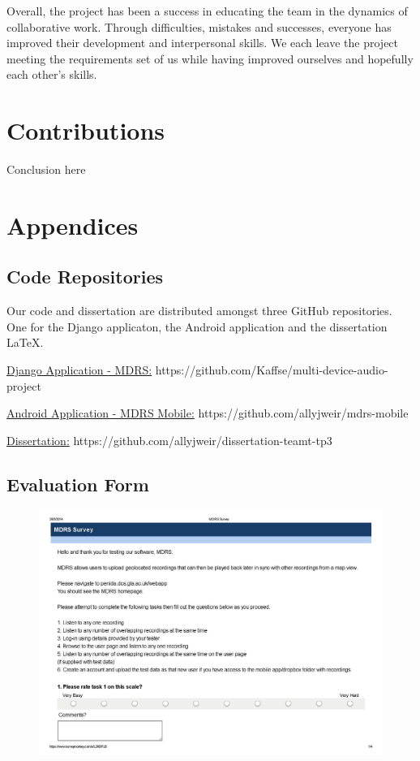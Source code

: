 \documentclass{l3proj}
\begin{document}
Overall, the project has been a success in educating the team in the dynamics of collaborative work. Through difficulties, mistakes and successes, everyone has improved their development and interpersonal skills. We each leave the project meeting the requirements set of us while having improved ourselves and hopefully each other's skills.

\section{Contributions}

Conclusion here

\section{Appendices}
\subsection{Code Repositories}
Our code and dissertation are distributed amongst three GitHub repositories. One for the Django applicaton, the Android application and the dissertation LaTeX.

\href{https://github.com/Kaffse/multi-device-audio-project}{Django Application - MDRS:}
https://github.com/Kaffse/multi-device-audio-project

\href{https://github.com/allyjweir/mdrs-mobile}{Android Application - MDRS Mobile:}
https://github.com/allyjweir/mdrs-mobile

\href{https://github.com/allyjweir/dissertation-teamt-tp3}{Dissertation:}
https://github.com/allyjweir/dissertation-teamt-tp3

\newpage
\subsection{Evaluation Form}

\begin{figure}[ht!]
\centering
\includegraphics[angle=270, width=1\textwidth]{images/mdrs_survey-page-001.jpg}
\end{figure}
\end{document}
